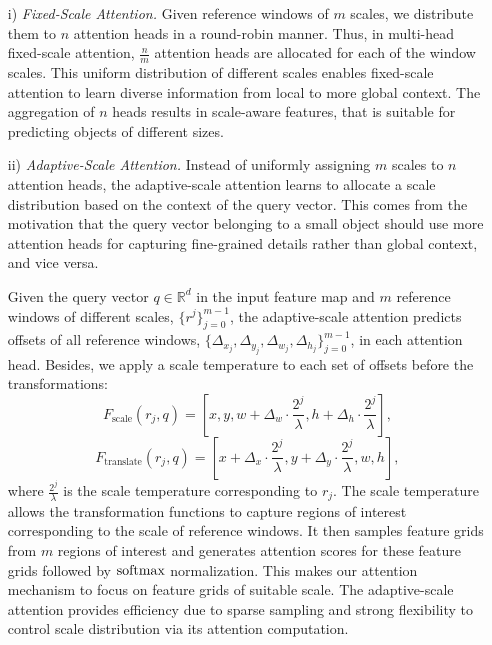 \begin{enumerate}[leftmargin=*,itemsep=0pt,topsep=0pt]
    \item[i)] \emph{Fixed-Scale Attention.} Given reference windows of $m$ scales, we distribute them to $n$ attention heads in a round-robin manner. Thus, in multi-head fixed-scale attention, $\frac{n}{m}$ attention heads are allocated for each of the window scales. This uniform distribution of different scales enables fixed-scale attention to learn diverse information from local to more global context. The aggregation of $n$ heads results in scale-aware features, that is suitable for predicting objects of different sizes.
    \item[ii)] \emph{Adaptive-Scale Attention.} Instead of uniformly assigning $m$ scales to $n$ attention heads, the adaptive-scale attention learns to allocate a scale distribution based on the context of the query vector. This comes from the motivation that the query vector belonging to a small object should use more attention heads for capturing fine-grained details rather than global context, and vice versa. 
    
    Given the query vector $q \in \mathbb{R}^d$ in the input feature map and $m$ reference windows of different scales, $\{r^j\}_{j=0}^{m-1}$, the adaptive-scale attention predicts offsets of all reference windows, $\{\Delta_{x_j},\Delta_{y_j},\Delta_{w_j},\Delta_{h_j}\}_{j=0}^{m-1}$, in each attention head. Besides, we apply a scale temperature to each set of offsets before the transformations:
    \begin{equation}
        F_\text{scale}(r_j, q) = [x, y, w + \Delta_w\cdot\frac{2^j}{\lambda}, h + \Delta_h\cdot\frac{2^j}{\lambda}], 
    \end{equation}
    \begin{equation}
        F_\text{translate}(r_j, q) = [x + \Delta_x\cdot\frac{2^j}{\lambda}, y + \Delta_y\cdot\frac{2^j}{\lambda}, w, h],
    \end{equation}
    where $\frac{2^j}{\lambda}$ is the scale temperature corresponding to $r_j$. The scale temperature allows the transformation functions to capture regions of interest corresponding to the scale of reference windows. It then samples feature grids from $m$ regions of interest and generates attention scores for these feature grids followed by $\mathrm{softmax}$ normalization. This makes our attention mechanism to focus on feature grids of suitable scale. The adaptive-scale attention provides efficiency due to sparse sampling and strong flexibility to control scale distribution via its attention computation.
\end{enumerate}

